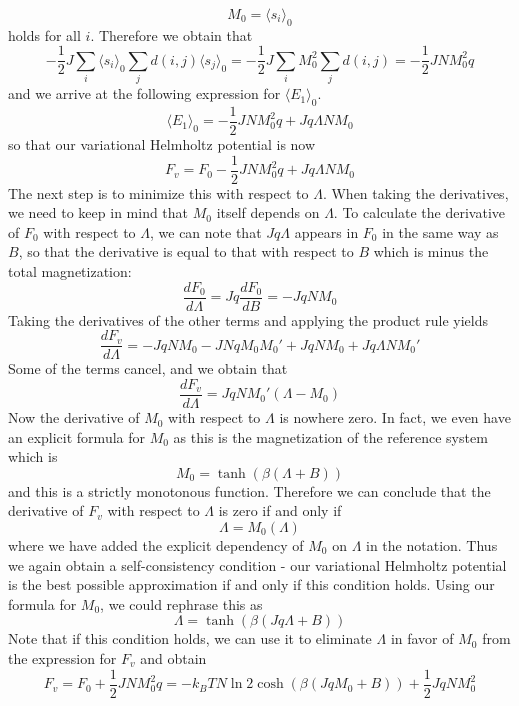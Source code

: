 \documentclass[a4paper, draft]{article}
\theoremstyle{own}
\theoremstyle{remark}
\begin{document}
$$
M_0 = \langle s_i \rangle_0
$$
holds for all $i$. 
Therefore we obtain that
$$
- \frac{1}{2} J \sum_i \langle s_i\rangle_0 \sum_j d(i, j)  \langle s_j \rangle_0 = - \frac{1}{2} J \sum_i M_0^2 \sum_j d(i, j)  = - \frac{1}{2} J N M_0^2 q
$$
and we arrive at the following expression for $\langle E_1 \rangle_0$.
$$
\langle E_1 \rangle_0 = - \frac{1}{2}J N M_0^2 q + J q \Lambda N M_0 
$$
so that our variational Helmholtz potential is now
$$
F_v = F_0 - \frac{1}{2}J N M_0^2 q + J q \Lambda N M_0 
$$
The next step is to minimize this with respect to $\Lambda$. When taking the derivatives, we need to keep in mind that $M_0$ itself depends on $\Lambda$. To calculate the derivative of $F_0$ with respect to $\Lambda$, we can note that $J q \Lambda$ appears in $F_0$ in the same way as $B$, so that the derivative is equal to that with respect to $B$ which is minus the total magnetization:
$$
\frac{dF_0}{d\Lambda} = J q \frac{dF_0}{dB} = - J q N M_0
$$
Taking the derivatives of the other terms and applying the product rule yields
$$
\frac{dF_v}{d\Lambda} = - J q N M_0 -  J N q M_0 M_0'   + J q N M_0  + J q \Lambda N M_0'
$$
Some of the terms cancel, and we obtain that
$$
\frac{dF_v}{d\Lambda} =  J  q N M_0' (\Lambda -   M_0) 
$$
Now the derivative of $M_0$ with respect to $\Lambda$ is nowhere zero. In fact, we even have an explicit formula for $M_0$ as this is the magnetization of the reference system which is
$$
M_0 = \tanh(\beta(\Lambda + B))
$$
and this is a strictly monotonous function. Therefore we can conclude that the derivative of $F_v$ with respect to $\Lambda$ is zero if and only if
$$
\Lambda =  M_0(\Lambda)
$$
where we have added the explicit dependency of $M_0$ on $\Lambda$ in the notation. Thus we again obtain a self-consistency condition - our variational Helmholtz potential is the best possible approximation if and only if this condition holds. Using our formula for $M_0$, we could rephrase this as
$$
\Lambda =  \tanh(\beta(Jq \Lambda + B))
$$
Note that if this condition holds, we can use it to eliminate $\Lambda$ in favor of $M_0$ from the expression for $F_v$ and obtain
$$
F_v = F_0 + \frac{1}{2}J N M_0^2 q  = - k_B T N \ln 2 \cosh(\beta(JqM_0 + B)) + \frac{1}{2} J q N M_0^2 
$$
\end{document}
